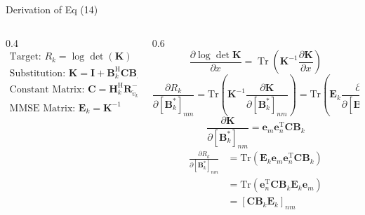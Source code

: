 \documentclass[aspectratio=169, 10pt]{beamer}
\begin{document}
\begin{frame}[label=app-wsr_Ri]{Derivation of Eq (14)}

    \begin{columns}
        \begin{column}{0.4\paperwidth}
            \begin{align*}
                \textrm{Target: } R_k = \log \det (\mathbf{K})                                                             \\
                \textrm{Substitution: } \mathbf{K} = \mathbf{I} + \mathbf{B}_k^\mathrm{H} \mathbf{C} \mathbf{B}_k          \\
                \textrm{Constant Matrix: } \mathbf{C} = \mathbf{H}_k^\mathrm{H} \mathbf{R}_{\tilde{v}_k}^{-1} \mathbf{H}_k \\
                \textrm{MMSE Matrix: } \mathbf{E}_k = \mathbf{K}^{-1}
            \end{align*}
        \end{column}
        \begin{column}{0.6\paperwidth}
            \begin{equation*}
                {\frac{\partial\log\operatorname{det}\mathbf{K}}{\partial x}}=\operatorname{Tr}(\mathbf{K}^{-1}{\frac{\partial\mathbf{K}}{\partial x}})
            \end{equation*}
            \begin{equation*}
                \frac{\partial R_k}{\partial [\mathbf{B}_k^*]_{nm}} = \mathrm{Tr}\left( \mathbf{K}^{-1} \frac{\partial \mathbf{K}}{\partial [\mathbf{B}_k^*]_{nm}} \right) = \mathrm{Tr}\left( \mathbf{E}_k \frac{\partial \mathbf{K}}{\partial [\mathbf{B}_k^*]_{nm}} \right)
            \end{equation*}
            \begin{equation*}
                \frac{\partial \mathbf{K}}{\partial [\mathbf{B}_k^*]_{nm}} = \mathbf{e}_m \mathbf{e}_n^\mathrm{T} \mathbf{C} \mathbf{B}_k
            \end{equation*}
            \begin{align*}
                \frac{\partial R_k}{\partial [\mathbf{B}_k^*]_{nm}}
                 & = \mathrm{Tr}\left( \mathbf{E}_k \mathbf{e}_m \mathbf{e}_n^\mathrm{T} \mathbf{C} \mathbf{B}_k \right) \\
                 & = \mathrm{Tr}\left( \mathbf{e}_n^\mathrm{T} \mathbf{C} \mathbf{B}_k \mathbf{E}_k \mathbf{e}_m \right) \\
                 & = [\mathbf{C} \mathbf{B}_k \mathbf{E}_k]_{nm}
            \end{align*}
        \end{column}
    \end{columns}


\end{frame}
\end{document}
